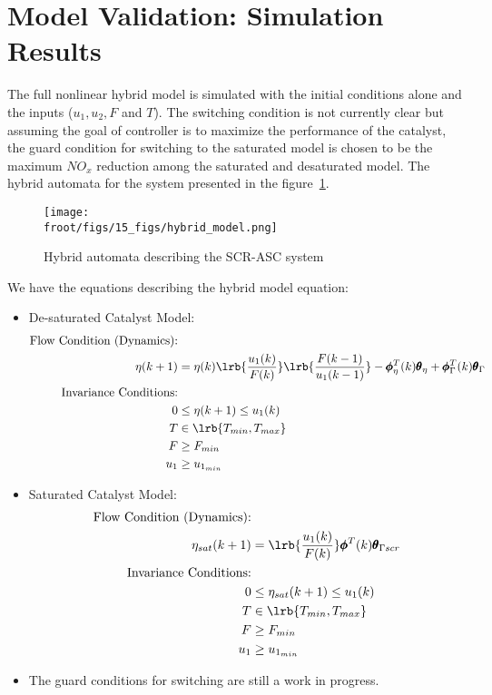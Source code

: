 \newpage
\section{Model Validation: Simulation Results}

The full nonlinear hybrid model is simulated with the initial conditions alone and the inputs ($u_1, u_2, F$ and $T$). The switching condition is not currently clear but assuming the goal of controller is to maximize the performance of the catalyst, the guard condition for switching to the saturated model is chosen to be the maximum $NO_x$ reduction among the saturated and desaturated model. The hybrid automata for the system presented in the figure~\ref{fig::hybrid_automata}.

\begin{figure}[H]
        \centering
        \texttt{[image: \\froot/figs/15\_figs/hybrid\_model.png]}
        \caption{Hybrid automata describing the SCR-ASC system}
        \label{fig::hybrid_automata}
\end{figure}

We have the equations describing the hybrid model equation:
\begin{itemize}
\item De-saturated Catalyst Model:
\begin{align*}
        \text{Flow Condition (Dynamics):} &\\
                \eta(k+1) &= \eta(k) \lrb{\frac{u_1(k)}{F(k)}} \lrb{\frac{F(k-1)}{u_1(k-1)}}
                    - \pmb \phi^T_{\eta}(k) \pmb \theta_{\eta}  + \pmb \phi_{\Gamma}^T(k) \pmb \theta_{\Gamma}
                    \\
        \text{Invariance Conditions:} & \\
                0 &\leq \eta (k+1) \leq u_1(k)\\
                T &\in \lrb{T_{min}, T_{max}}\\
                F &\geq F_{min}\\
                u_1 &\geq u_{1_{min}}
\end{align*}
\item Saturated Catalyst Model:
\begin{align*}
        \text{Flow Condition (Dynamics):} & \\
                \eta_{sat}(k+1) &= \lrb{\frac{u_1(k)}{F(k)}} \pmb \phi^T(k) \pmb \theta_{\Gamma scr}\\
        \text{Invariance Conditions:} & \\
                0 &\leq \eta_{sat} (k+1) \leq u_1(k)\\
                T &\in \lrb{T_{min}, T_{max}}\\
                F &\geq F_{min}\\
                u_1 &\geq u_{1_{min}}
\end{align*}

\item The guard conditions for switching are still a work in progress.
\end{itemize}


